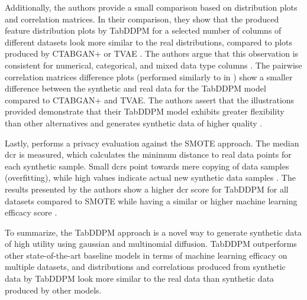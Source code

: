Additionally, the authors provide a small comparison based on distribution plots and correlation matrices.
In their comparison, they show that the produced feature distribution plots by TabDDPM for a selected number of columns of different datasets look more similar 
to the real distributions, compared to plots produced by CTABGAN+ or TVAE \cite{kotelnikov2022TabDDPMModellingTabular}.
The authors argue that this observation is consistent for numerical, categorical, and mixed data type columns \cite{kotelnikov2022TabDDPMModellingTabular}.
The pairwise correlation matrices difference plots (performed similarly to in \cite{brenninkmeijer2019GenerationEvaluationTabular}) show a smaller difference between the synthetic and real data for the TabDDPM model compared to CTABGAN+ and TVAE.
The authors assert that the illustrations provided demonstrate that their TabDDPM model exhibits greater flexibility than other alternatives and generates synthetic data of higher quality \cite{kotelnikov2022TabDDPMModellingTabular}.

Lastly, \cite{kotelnikov2022TabDDPMModellingTabular} performs a privacy evaluation against the SMOTE approach.
The median \gls{dcr} is measured, which calculates the minimum distance to real data points for each synthetic sample.
Small \glspl{dcr} point towards mere copying of data samples (overfitting), while high values indicate actual new synthetic data samples \cite{kotelnikov2022TabDDPMModellingTabular}.
The results presented by the authors show a higher \gls{dcr} score for TabDDPM for all datasets compared to SMOTE while having a similar or higher machine learning efficacy score \cite{kotelnikov2022TabDDPMModellingTabular}.

To summarize, the TabDDPM approach is a novel way to generate synthetic data of high utility using gaussian and multinomial diffusion.
TabDDPM outperforms other state-of-the-art baseline models in terms of machine learning efficacy on multiple datasets, and distributions and correlations produced from synthetic data by TabDDPM look more similar to the real data than synthetic data produced by other models.






